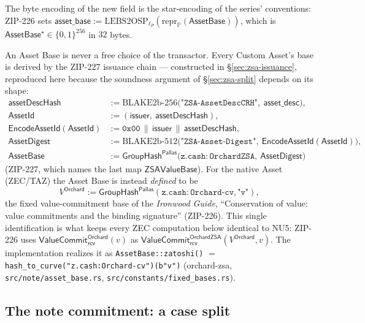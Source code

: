 \documentclass[11pt,a4paper]{article}
\theoremstyle{definition}
\newcommand{\Pallas}{\ensuremath{\mathsf{Pallas}}}
\newcommand{\GroupHash}{\ensuremath{\mathsf{GroupHash}}}
\newcommand{\rcv}{\ensuremath{\mathsf{rcv}}}
\begin{document}
The byte encoding of the new field is the star-encoding of the series'
conventions: ZIP-226 sets $\mathsf{asset\_base} :=
\mathrm{LEBS2OSP}_{\ell_P}(\mathrm{repr}_{\mathbb{P}}(\mathsf{AssetBase}))$,
which is $\mathsf{AssetBase}^\star \in \{0,1\}^{256}$ in $32$ bytes.

An Asset Base is never a free choice of the transactor. Every Custom Asset's
base is derived by the ZIP-227 issuance chain --- constructed in
\S\ref{sec:zsa-issuance}, reproduced here because the soundness argument of
\S\ref{sec:zsa-split} depends on its shape:
\begin{align*}
\mathsf{assetDescHash} &:=
  \mathrm{BLAKE2b\text{-}256}\bigl(\texttt{"ZSA-AssetDescCRH"},
  \ \mathsf{asset\_desc}\bigr), \\
\mathsf{AssetId} &:= (\mathsf{issuer},\ \mathsf{assetDescHash}), \\
\mathsf{EncodeAssetId}(\mathsf{AssetId}) &:= \mathtt{0x00} \,\|\,
  \mathsf{issuer}
  \,\|\, \mathsf{assetDescHash}, \\
\mathsf{AssetDigest} &:=
  \mathrm{BLAKE2b\text{-}512}\bigl(\texttt{"ZSA-Asset-Digest"},
  \ \mathsf{EncodeAssetId}(\mathsf{AssetId})\bigr), \\
\mathsf{AssetBase} &:= \GroupHash^{\Pallas}\bigl(\mathtt{z.cash:OrchardZSA},
  \ \mathsf{AssetDigest}\bigr)
\end{align*}
(ZIP-227, which names the last map $\mathsf{ZSAValueBase}$). For the native
Asset (ZEC/TAZ) the Asset Base is instead \emph{defined} to be
\[
V^{\mathsf{Orchard}} :=
\GroupHash^{\Pallas}(\mathtt{z.cash:Orchard\text{-}cv}, \texttt{"v"}),
\]
the fixed value-commitment base of the \emph{Ironwood Guide}, ``Conservation
of value: value commitments and the binding signature'' (ZIP-226). This
single identification is what keeps every ZEC computation below identical to
NU5: ZIP-226 uses $\mathsf{ValueCommit}^{\mathsf{Orchard}}_{\rcv}(v)$ as
$\mathsf{ValueCommit}^{\mathsf{OrchardZSA}}_{\rcv}(V^{\mathsf{Orchard}}, v)$.
The implementation realizes it as \texttt{AssetBase::zatoshi()} $=$
\texttt{hash\_to\_curve("z.cash:Orchard-cv")(b"v")}
(\textsf{orchard-zsa}, \texttt{src/note/asset\_base.rs},
\texttt{src/constants/fixed\_bases.rs}).

\subsection{The note commitment: a case split}\label{sec:zsa-notecommit}
\end{document}
